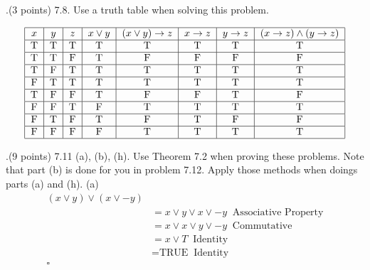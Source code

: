 \documentclass[12pt]{article}
\begin{document}
.(3 points) 7.8.  Use a truth table when solving this problem. 
\vspace{.15in}

\[ %
\begin{tabular}{|c|c|c|c|c|c|c|c|} 
\hline %
$x$ & $y$ & $z$ & $x \vee y$ & $(x \vee y) \rightarrow z$ & $x\rightarrow z$ & $y \rightarrow z$ & $(x \rightarrow z) \wedge (y \rightarrow z)$ \\ 
\hline
T&T&T&T&T&T&T&T \\
\hline
T&T&F&T&F&F&F&F \\
\hline 
T&F&T&T&T&T&T&T \\
\hline
F&T&T&T&T&T&T&T \\
\hline
T&F&F&T&F&F&T&F \\
\hline
F&F&T&F&T&T&T&T \\
\hline 
F&T&F&T&F&T&F&F \\
\hline
F&F&F&F&T&T&T&T \\
\hline

\end{tabular} %
\] 
\vspace{0.5in}



.(9 points) 7.11 (a), (b), (h).  Use Theorem 7.2 when proving these problems.  Note that part (b) is done for you in problem 7.12.  Apply those methods when doings parts (a) and (h).  
\newline
\vspace{.15in}
(a)  \[
\begin{aligned} 
(x \vee y) \vee (x \vee -y) \\
&= x \vee y \vee x \vee -y  \;\;  \mbox{Associative Property} \\ %
&= x \vee x \vee y \vee -y  \;\; \mbox{Commutative}\\
&= x \vee T \;\; \mbox{Identity}\\
&= \mbox{TRUE} \;\; \mbox{Identity} \\
\square \\
\end{aligned}
\]
\end{document}
